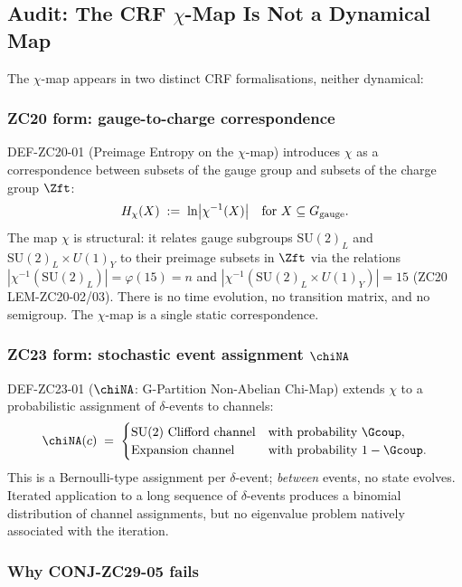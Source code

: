 \documentclass[12pt, a4paper]{article}
\begin{document}
\subsection{Audit: The CRF $\chi$-Map Is Not a Dynamical Map}
\label{sec:chi-audit}

The $\chi$-map appears in two distinct CRF formalisations,
neither dynamical:

\subsubsection{ZC20 form: gauge-to-charge correspondence}

DEF-ZC20-01 (Preimage Entropy on the $\chi$-map) introduces
$\chi$ as a correspondence between subsets of the gauge group
and subsets of the charge group $\Zft$:
\[
  H_\chi(X) \;:=\; \ln \bigl|\chi^{-1}(X)\bigr|
  \quad\text{for } X \subseteq G_{\rm gauge}.
\]
The map $\chi$ is structural: it relates gauge subgroups
$\mathrm{SU}(2)_L$ and $\mathrm{SU}(2)_L \times U(1)_Y$ to
their preimage subsets in $\Zft$ via the relations
$|\chi^{-1}(\mathrm{SU}(2)_L)| = \varphi(15) = n$ and
$|\chi^{-1}(\mathrm{SU}(2)_L \times U(1)_Y)| = 15$ (ZC20
LEM-ZC20-02/03). There is no time evolution, no transition
matrix, and no semigroup. The $\chi$-map is a single static
correspondence.

\subsubsection{ZC23 form: stochastic event assignment $\chiNA$}

DEF-ZC23-01 ($\chiNA$: G-Partition Non-Abelian Chi-Map)
extends $\chi$ to a probabilistic assignment of $\delta$-events
to channels:
\[
  \chiNA(c) \;=\;
  \begin{cases}
    \text{SU(2) Clifford channel} & \text{with probability }
      \Gcoup,\\
    \text{Expansion channel}      & \text{with probability }
      1-\Gcoup.
  \end{cases}
\]
This is a Bernoulli-type assignment per $\delta$-event;
\emph{between} events, no state evolves. Iterated application
to a long sequence of $\delta$-events produces a binomial
distribution of channel assignments, but no eigenvalue
problem natively associated with the iteration.

\subsubsection{Why CONJ-ZC29-05 fails}
\end{document}
